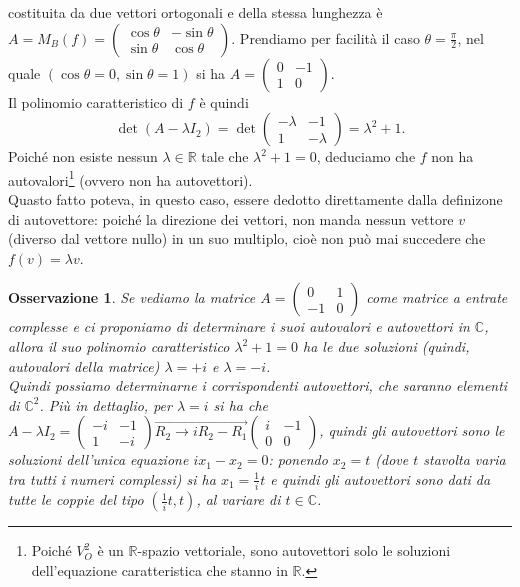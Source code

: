 \documentclass{book}
\newtheorem{osservazione}{Osservazione}[section]
\begin{document}
costituita da due vettori ortogonali e della stessa lunghezza è $A=M_B(f)=
\begin{pmatrix}
  \cos\theta & -\sin\theta\\
  \sin\theta & \cos\theta
\end{pmatrix}
$. Prendiamo per facilità il caso $\theta=\frac{\pi}{2}$, nel quale $(\cos\theta=0,\sin\theta=1)$ si ha $A=
\begin{pmatrix}
  0 & -1\\
  1 & 0
\end{pmatrix}
$.\\
Il polinomio caratteristico di $f$ è quindi
\begin{equation*}
  \det(A-\lambda I_2)=\det
  \begin{pmatrix}
    -\lambda & -1\\
    1 & -\lambda
  \end{pmatrix}=\lambda^2+1.
\end{equation*}
Poiché non esiste nessun $\lambda\in \mathds{R}$ tale che $\lambda^2+1=0$, deduciamo che $f$ non ha
autovalori\footnote{Poiché $V_O^2$ è un $\mathds{R}$-spazio vettoriale, sono autovettori solo le soluzioni
  dell'equazione caratteristica che stanno in $\mathds{R}$.} (ovvero non ha autovettori).\\
Quasto fatto poteva, in questo caso, essere dedotto direttamente dalla definizone di autovettore: poiché la
direzione dei vettori, non manda nessun vettore $v$ (diverso dal vettore nullo) in un suo multiplo, cioè non può
mai succedere che $f(v)=\lambda v$.
\begin{osservazione}
  \label{oss:5.2.1.}
  Se vediamo la matrice $A=
  \begin{pmatrix}
    0 & 1 \\
    -1 & 0
  \end{pmatrix}
  $ come matrice a entrate complesse e ci proponiamo di determinare i suoi autovalori e autovettori in
  $\mathds{C}$, allora il suo polinomio caratteristico $\lambda^2 +1=0$ ha le due soluzioni (quindi, autovalori
  della matrice) $\lambda =+i$ e $\lambda=-i$.\\
  Quindi possiamo determinarne i corrispondenti autovettori, che saranno elementi di $\mathds{C}^2$. Più in
  dettaglio, per $\lambda=i$ si ha che $A-\lambda I_2=
  \begin{pmatrix}
    -i & -1\\
    1 & -i
  \end{pmatrix}\overset{\rightarrow}{R_2\to i R_2-R_1}
  \begin{pmatrix}
    i &-1\\
    0 & 0
  \end{pmatrix}
  $, quindi gli autovettori sono le soluzioni dell'unica equazione $ix_1-x_2=0$: ponendo $x_2=t$ (dove $t$ stavolta
  varia tra tutti i numeri complessi) si ha $x_1=\frac{1}{i}t$ e quindi gli autovettori sono dati da tutte le
  coppie del tipo $(\frac{1}{i}t,t)$, al variare di $t\in \mathds{C}$.
\end{osservazione}
\end{document}
